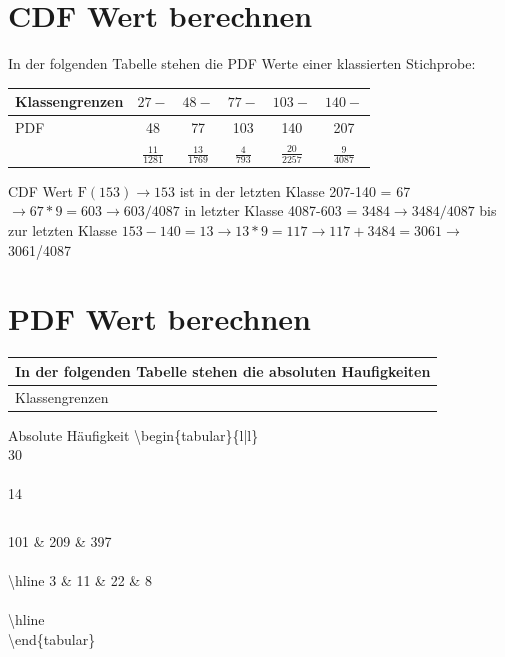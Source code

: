 \documentclass[10pt]{article}
\begin{document}
\section*{CDF Wert berechnen}
In der folgenden Tabelle stehen die PDF Werte einer klassierten Stichprobe:

\begin{center}
\begin{tabular}{|l|c|c|c|c|c|}
\hline
Klassengrenzen & $27-$ & $48-$ & $77-$ & $103-$ & $140-$ \\
\hline
PDF & 48 & 77 & 103 & 140 & 207 \\
\hline
 & $\frac{11}{1281}$ & $\frac{13}{1769}$ & $\frac{4}{793}$ & $\frac{20}{2257}$ & $\frac{9}{4087}$ \\
\hline
\end{tabular}
\end{center}

CDF Wert $\mathrm{F}(153) \rightarrow 153$ ist in der letzten Klasse 207-140 = 67 $\rightarrow 67 * 9=603 \rightarrow 603 / 4087$ in letzter Klasse 4087-603 = $3484 \rightarrow 3484 / 4087$ bis zur letzten Klasse $153-140=13 \rightarrow 13 * 9=117 \rightarrow 117+3484=3061 \rightarrow$ 3061/4087

\section*{PDF Wert berechnen}
\begin{center}
\begin{tabular}{l}
In der folgenden Tabelle stehen die absoluten Haufigkeiten \\
\hline
Klassengrenzen \\
\hline
\end{tabular}
\end{center}

Absolute Häufigkeit \textbackslash begin\{tabular\}\{l|l\}\\
30 \\
\\
14

 \begin{tabular}{cc|c|c|c|}
\end{tabular}

101 \& 209 \& 397 \\
\\
\textbackslash hline 3 \& 11 \& 22 \& 8 \\
\\
\textbackslash hline\\
\textbackslash end\{tabular\}
\end{document}
